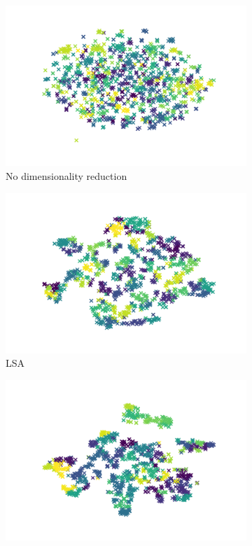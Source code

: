 \begin{figure}
  \centering
  \begin{subfigure}{.3\textwidth}
      \centering
      \includegraphics[width=\linewidth]{imgs/affinity_propagation.png}
      \caption{No dimensionality reduction}
      \label{fig:affinity_propagation_no_dim}
  \end{subfigure}
  \begin{subfigure}{.3\textwidth}
    \centering
    \includegraphics[width=\linewidth]{imgs/affinity_propagation_lsa.png}
    \caption{LSA}
    \label{fig:affinity_propagation_lsa}
  \end{subfigure}%
  \begin{subfigure}{.3\textwidth}
    \centering
    \includegraphics[width=\linewidth]{imgs/affinity_propagation_spectral.png}

\end{subfigure}
\end{figure}
